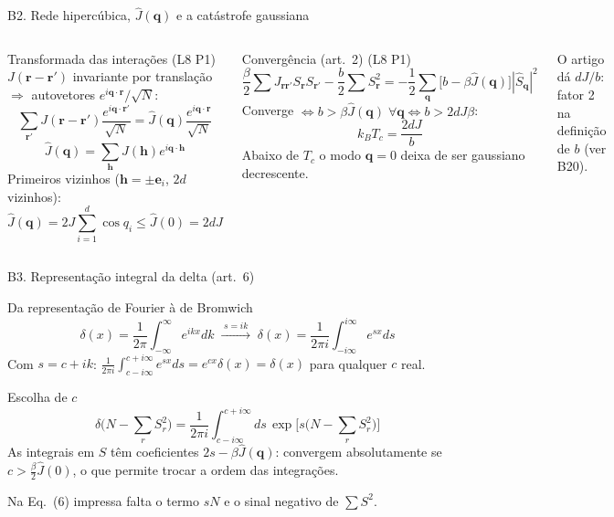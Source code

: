 \documentclass[10pt,aspectratio=169]{beamer}
\newcommand{\lista}[1]{\textcolor{qcdGreen!70!black}{\small(#1)}}
\newcommand{\eq}[1]{\textcolor{qcdBlue!70!black}{\small(#1)}}
\begin{document}
\begin{frame}{B2. Rede hipercúbica, $\hat J(\mathbf q)$ e a catástrofe gaussiana}
  \small
  \begin{columns}[T]
    \begin{block}{Transformada das interações \lista{L8 P1}}
      $J(\mathbf r-\mathbf r')$ invariante por translação $\Rightarrow$ autovetores $e^{i\mathbf q\cdot\mathbf r}/\sqrt N$:
      \[\sum_{\mathbf r'}J(\mathbf r-\mathbf r')\frac{e^{i\mathbf q\cdot\mathbf r'}}{\sqrt N}=\hat J(\mathbf q)\frac{e^{i\mathbf q\cdot\mathbf r}}{\sqrt N}\]
      \[\hat J(\mathbf q)=\sum_{\mathbf h}J(\mathbf h)e^{i\mathbf q\cdot\mathbf h}\]
      Primeiros vizinhos ($\mathbf h=\pm\mathbf e_i$, $2d$ vizinhos):
      \[\hat J(\mathbf q)=2J\sum_{i=1}^d\cos q_i\le\hat J(0)=2dJ\]
    \end{block}
    \begin{block}{Convergência \eq{art.~2} \lista{L8 P1}}
      \[\frac\beta2\sum J_{\mathbf r\mathbf r'}S_{\mathbf r}S_{\mathbf r'}-\frac b2\sum S_{\mathbf r}^2
        =-\frac12\sum_{\mathbf q}\big[b-\beta\hat J(\mathbf q)\big]|\hat S_{\mathbf q}|^2\]
      Converge $\iff b>\beta\hat J(\mathbf q)\;\forall\mathbf q\iff b>2dJ\beta$:
      \[k_BT_c=\frac{2dJ}{b}\]
      Abaixo de $T_c$ o modo $\mathbf q=0$ deixa de ser gaussiano decrescente.
    \end{block}
    {\footnotesize O artigo dá $dJ/b$: fator 2 na definição de $b$ (ver B20).}
  \end{columns}
\end{frame}

\begin{frame}{B3. Representação integral da delta \eq{art.~6}}
  \small
  \begin{block}{Da representação de Fourier à de Bromwich}
    \[\delta(x)=\frac1{2\pi}\int_{-\infty}^{\infty}e^{ikx}dk\;\xrightarrow{\;s=ik\;}\;
      \delta(x)=\frac1{2\pi i}\int_{-i\infty}^{i\infty}e^{sx}ds\]
    Com $s=c+ik$: $\frac1{2\pi i}\int_{c-i\infty}^{c+i\infty}e^{sx}ds=e^{cx}\delta(x)=\delta(x)$ para qualquer $c$ real.
  \end{block}
  \begin{block}{Escolha de $c$}
    \[\delta\Big(N-\sum_rS_r^2\Big)=\frac1{2\pi i}\int_{c-i\infty}^{c+i\infty}ds\,\exp\Big[s\Big(N-\sum_rS_r^2\Big)\Big]\]
    As integrais em $S$ têm coeficientes $2s-\beta\hat J(\mathbf q)$: convergem absolutamente se
    $c>\frac\beta2\hat J(0)$, o que permite trocar a ordem das integrações.
  \end{block}
  {\footnotesize Na Eq.~(6) impressa falta o termo $sN$ e o sinal negativo de $\sum S^2$.}
\end{frame}
\end{document}
